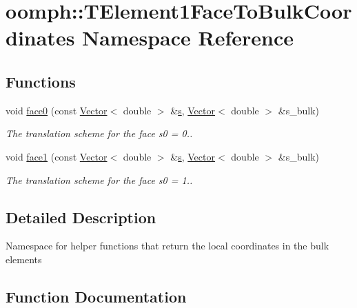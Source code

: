 \hypertarget{namespaceoomph_1_1TElement1FaceToBulkCoordinates}{}\section{oomph\+:\+:T\+Element1\+Face\+To\+Bulk\+Coordinates Namespace Reference}
\label{namespaceoomph_1_1TElement1FaceToBulkCoordinates}
\subsection*{Functions}
\begin{DoxyCompactItemize}
\item 
void \hyperlink{namespaceoomph_1_1TElement1FaceToBulkCoordinates_a8b710a8ffaee12096fd755aba038bcf3}{face0} (const \hyperlink{classoomph_1_1Vector}{Vector}$<$ double $>$ \&\hyperlink{cfortran_8h_ab7123126e4885ef647dd9c6e3807a21c}{s}, \hyperlink{classoomph_1_1Vector}{Vector}$<$ double $>$ \&s\+\_\+bulk)
\begin{DoxyCompactList}\small\item\em The translation scheme for the face s0 = 0.. \end{DoxyCompactList}\item 
void \hyperlink{namespaceoomph_1_1TElement1FaceToBulkCoordinates_a951b607f4bfb58490da5f1892974c202}{face1} (const \hyperlink{classoomph_1_1Vector}{Vector}$<$ double $>$ \&\hyperlink{cfortran_8h_ab7123126e4885ef647dd9c6e3807a21c}{s}, \hyperlink{classoomph_1_1Vector}{Vector}$<$ double $>$ \&s\+\_\+bulk)
\begin{DoxyCompactList}\small\item\em The translation scheme for the face s0 = 1.. \end{DoxyCompactList}\end{DoxyCompactItemize}


\subsection{Detailed Description}
Namespace for helper functions that return the local coordinates in the bulk elements 

\subsection{Function Documentation}
\mbox{\label{namespaceoomph_1_1TElement1FaceToBulkCoordinates_a8b710a8ffaee12096fd755aba038bcf3}} 

